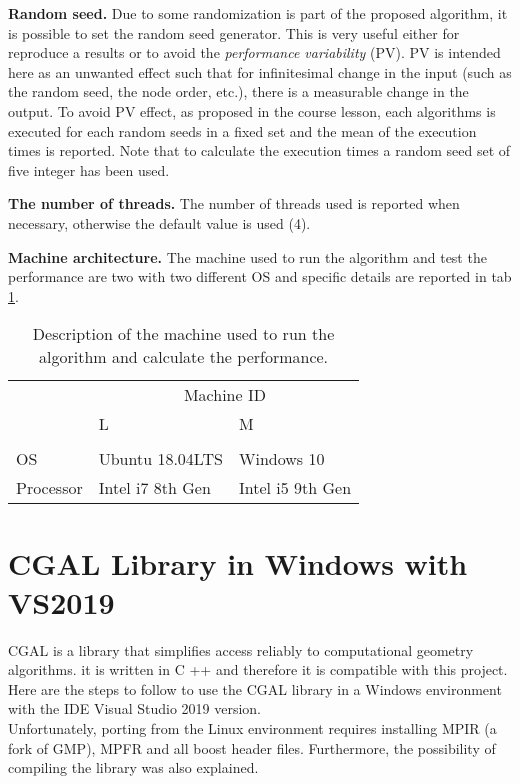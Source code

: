 \documentclass[11pt, english, openany]{report}
\begin{document}
\begin{appendices}
			\textbf{Random seed.} Due to some randomization is part of the proposed algorithm, it is possible to set the random seed generator. This is very useful either for reproduce a results or to avoid the \textit{performance variability} (PV). PV is intended here as an unwanted effect such that for infinitesimal change in the input (such as the random seed, the node order, etc.), there is a measurable change in the output. To avoid PV effect, as proposed in the course lesson, each algorithms is executed for each random seeds in a fixed set and the mean of the execution times is reported. Note that to calculate the execution times a random seed set of five integer has been used.
			
			\textbf{The number of threads.} The number of threads used is reported when necessary, otherwise the default value is used (4).
			
			\textbf{Machine architecture.} The machine used to run the algorithm and test the performance are two with two different OS and specific details are reported in tab \ref{tab:machines}.
			\begin{table}[h]
				\begin{center}
					\caption{Description of the machine used to run the algorithm and calculate the performance.}
					\label{tab:machines}
					\begin{tabular}{lll}
									&   \multicolumn{2}{c}{Machine ID} 	\\
						 			& L 				&	 M 			\\ \hline \\
						OS 			& Ubuntu 18.04LTS 	& Windows 10 	\\
						Processor	& Intel i7 8th Gen	&	Intel i5 9th Gen		\\
					\end{tabular}
				\end{center}
			\end{table}

		\chapter{CGAL Library in Windows with VS2019} \label{sec:cagalOne}
CGAL is a library that simplifies access reliably to computational geometry algorithms. it is written in C ++ and therefore it is compatible with this project. Here are the steps to follow to use the CGAL library in a Windows environment with the IDE Visual Studio 2019 version.\\ Unfortunately, porting from the Linux environment requires installing MPIR (a fork of GMP), MPFR and all boost header files. Furthermore, the possibility of compiling the library was also explained.

\end{appendices}
\end{document}
